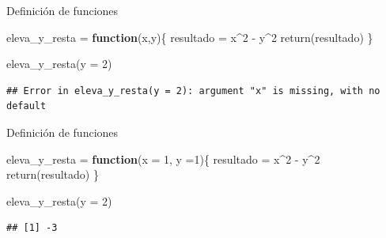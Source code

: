 \documentclass[
  ignorenonframetext,
]{beamer}
\newenvironment{Shaded}{\begin{snugshade}}{\end{snugshade}}
\newcommand{\AttributeTok}[1]{\textcolor[rgb]{0.77,0.63,0.00}{#1}}
\newcommand{\ControlFlowTok}[1]{\textcolor[rgb]{0.13,0.29,0.53}{\textbf{#1}}}
\newcommand{\DecValTok}[1]{\textcolor[rgb]{0.00,0.00,0.81}{#1}}
\newcommand{\FunctionTok}[1]{\textcolor[rgb]{0.00,0.00,0.00}{#1}}
\newcommand{\NormalTok}[1]{#1}
\newcommand{\OtherTok}[1]{\textcolor[rgb]{0.56,0.35,0.01}{#1}}
\newcommand{\SpecialCharTok}[1]{\textcolor[rgb]{0.00,0.00,0.00}{#1}}
\begin{document}
\begin{frame}[fragile]{Definición de funciones}
\protect\hypertarget{definiciuxf3n-de-funciones-4}{}
\begin{Shaded}
\begin{Highlighting}[]
\NormalTok{eleva\_y\_resta }\OtherTok{=} \ControlFlowTok{function}\NormalTok{(x,y)\{}
\NormalTok{  resultado }\OtherTok{=}\NormalTok{ x}\SpecialCharTok{\^{}}\DecValTok{2} \SpecialCharTok{{-}}\NormalTok{ y}\SpecialCharTok{\^{}}\DecValTok{2}
  \FunctionTok{return}\NormalTok{(resultado)}
\NormalTok{\}}

\FunctionTok{eleva\_y\_resta}\NormalTok{(}\AttributeTok{y =} \DecValTok{2}\NormalTok{)}
\end{Highlighting}
\end{Shaded}

\begin{verbatim}
## Error in eleva_y_resta(y = 2): argument "x" is missing, with no default
\end{verbatim}
\end{frame}

\begin{frame}[fragile]{Definición de funciones}
\protect\hypertarget{definiciuxf3n-de-funciones-5}{}
\begin{Shaded}
\begin{Highlighting}[]
\NormalTok{eleva\_y\_resta }\OtherTok{=} \ControlFlowTok{function}\NormalTok{(}\AttributeTok{x =} \DecValTok{1}\NormalTok{, }\AttributeTok{y =}\DecValTok{1}\NormalTok{)\{}
\NormalTok{  resultado }\OtherTok{=}\NormalTok{ x}\SpecialCharTok{\^{}}\DecValTok{2} \SpecialCharTok{{-}}\NormalTok{ y}\SpecialCharTok{\^{}}\DecValTok{2}
  \FunctionTok{return}\NormalTok{(resultado)}
\NormalTok{\}}

\FunctionTok{eleva\_y\_resta}\NormalTok{(}\AttributeTok{y =} \DecValTok{2}\NormalTok{)}
\end{Highlighting}
\end{Shaded}

\begin{verbatim}
## [1] -3
\end{verbatim}
\end{frame}
\end{document}
